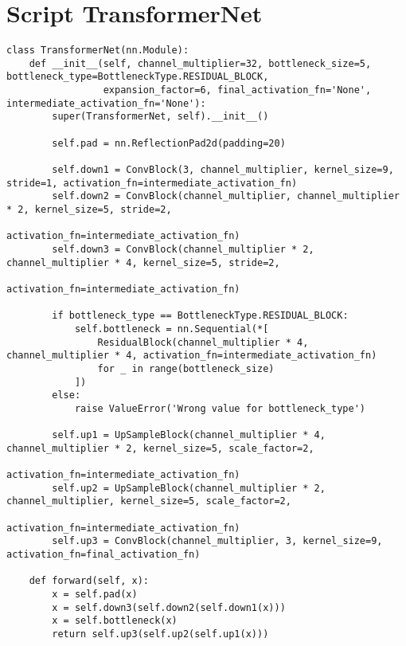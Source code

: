 \section{Script TransformerNet}
\label{sec:script_transformer_net}
\begin{listing}[H]
\begin{verbatim}
class TransformerNet(nn.Module):
    def __init__(self, channel_multiplier=32, bottleneck_size=5, bottleneck_type=BottleneckType.RESIDUAL_BLOCK,
                 expansion_factor=6, final_activation_fn='None', intermediate_activation_fn='None'):
        super(TransformerNet, self).__init__()

        self.pad = nn.ReflectionPad2d(padding=20)

        self.down1 = ConvBlock(3, channel_multiplier, kernel_size=9, stride=1, activation_fn=intermediate_activation_fn)
        self.down2 = ConvBlock(channel_multiplier, channel_multiplier * 2, kernel_size=5, stride=2,
                               activation_fn=intermediate_activation_fn)
        self.down3 = ConvBlock(channel_multiplier * 2, channel_multiplier * 4, kernel_size=5, stride=2,
                               activation_fn=intermediate_activation_fn)

        if bottleneck_type == BottleneckType.RESIDUAL_BLOCK:
            self.bottleneck = nn.Sequential(*[
                ResidualBlock(channel_multiplier * 4, channel_multiplier * 4, activation_fn=intermediate_activation_fn)
                for _ in range(bottleneck_size)
            ])
        else:
            raise ValueError('Wrong value for bottleneck_type')

        self.up1 = UpSampleBlock(channel_multiplier * 4, channel_multiplier * 2, kernel_size=5, scale_factor=2,
                                 activation_fn=intermediate_activation_fn)
        self.up2 = UpSampleBlock(channel_multiplier * 2, channel_multiplier, kernel_size=5, scale_factor=2,
                                 activation_fn=intermediate_activation_fn)
        self.up3 = ConvBlock(channel_multiplier, 3, kernel_size=9, activation_fn=final_activation_fn)

    def forward(self, x):
        x = self.pad(x)
        x = self.down3(self.down2(self.down1(x)))
        x = self.bottleneck(x)
        return self.up3(self.up2(self.up1(x)))
\end{verbatim}
\label{lst:script_transformer_net}
\end{listing}

